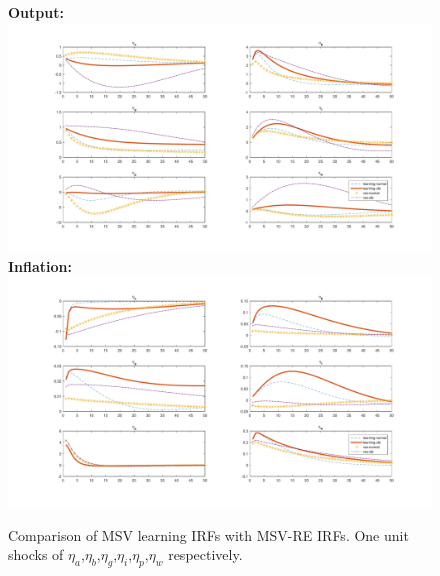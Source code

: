 \documentclass[12pt,reqno]{article}
\numberwithin{equation}{section}
\begin{document}
\begin{figure}[H]
\caption{Comparison of MSV learning IRFs with MSV-RE IRFs. One unit shocks of $\eta_a$,$\eta_b$,$\eta_g$,$\eta_i$,$\eta_p$,$\eta_w$ respectively.}
\label{irf_msv_2}
\textbf{Output:}\\
\includegraphics[scale=0.5]{MSV_impresp_output_riseComp.pdf}
\textbf{Inflation:}\\
\includegraphics[scale=0.5]{MSV_impresp_pinf_riseComp.pdf}
\end{figure}
\end{document}
